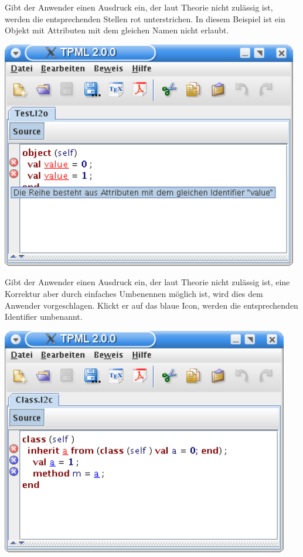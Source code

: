 {
  Gibt der Anwender einen Ausdruck ein, der laut Theorie nicht zulässig ist, werden die entsprechenden
  Stellen rot unterstrichen. In diesem Beispiel ist ein Objekt mit Attributen mit dem gleichen Namen
  nicht erlaubt.
  \begin{center}
    \includegraphics[height=10cm]{images/parser_error.png}
  \end{center}
}

{
  Gibt der Anwender einen Ausdruck ein, der laut Theorie nicht zulässig ist, eine Korrektur aber durch
  einfaches Umbenennen möglich ist, wird dies dem Anwender vorgeschlagen. Klickt er auf das blaue Icon,
  werden die entsprechenden Identifier umbenannt.
  \begin{center}
    \includegraphics[height=10cm]{images/parser_rename.png}
  \end{center}
}